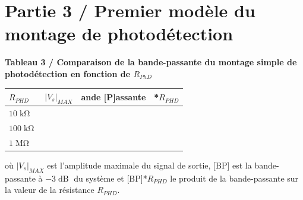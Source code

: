 \section{Partie 3 / Premier modèle du montage de photodétection}

\noindent
{}


\newpage

\textbf{Tableau 3 / Comparaison de la bande-passante du montage simple de photodétection en fonction de $R_{PhD}$}

\begin{center}
\Large{
\begin{tabular}{|>{\centering\arraybackslash}p{2cm}|>{\centering\arraybackslash}p{3cm}|>{\centering\arraybackslash}p{5cm}|>{\centering\arraybackslash}p{4cm}|}
  \hline
  $R_{PHD}$ & $|V_s|_{MAX}$ & [B]ande [P]assante & [BP]*$R_{PHD}$ \\
  \hline
  $10\operatorname{k\Omega}$ & & & \rule{0pt}{1.8em} \\
  \hline
  $100\operatorname{k\Omega}$ & & & \rule{0pt}{1.8em} \\
  \hline
  $1\operatorname{M\Omega}$ & & & \rule{0pt}{1.8em} \\
  \hline
\end{tabular}
}
\end{center}

où $|V_s|_{MAX}$ est l'amplitude maximale du signal de sortie, [BP] est la bande-passante à $-3\operatorname{dB}$ du système et [BP]*$R_{PHD}$ le produit de la bande-passante sur la valeur de la résistance $R_{PHD}$.





